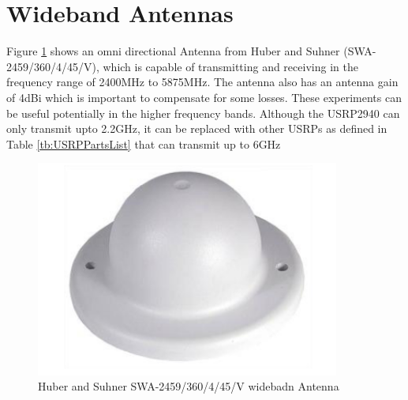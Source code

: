 \section{Wideband Antennas}\label{sec:WdBdAntennas}

Figure \ref{fig:HandSAnt} shows an omni directional Antenna from Huber and Suhner (SWA-
2459/360/4/45/V), which is capable of transmitting and receiving in the frequency range of 2400MHz to 5875MHz. The antenna also has an antenna gain of 4dBi which is important to compensate for some losses. These experiments can be useful potentially in the higher frequency bands. Although the USRP2940 can only transmit upto 2.2\si{\giga\hertz}, it can be replaced with other USRPs as defined in Table \ref{tb:USRPPartsList} that can transmit up to 6\si{\giga\hertz}

\begin{figure}[!htb]
    \centering
    \includegraphics[width=10cm]{images/HuberAntenna.png}
    \caption{Huber and Suhner SWA-2459/360/4/45/V widebadn Antenna}
    \label{fig:HandSAnt}
\end{figure}

